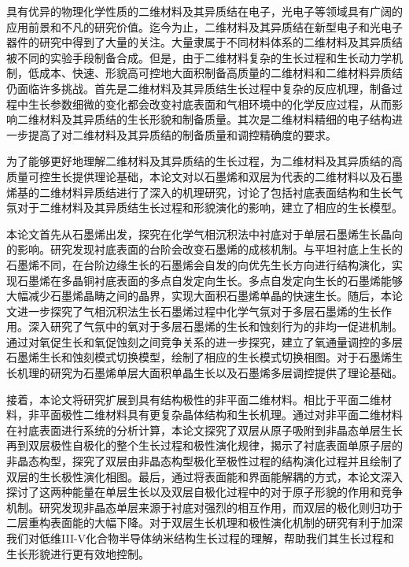 \begin{chineseabstract}
    具有优异的物理化学性质的二维材料及其异质结在电子，光电子等领域具有广阔的应用前景和不凡的研究价值。迄今为止，二维材料及其异质结在新型电子和光电子器件的研究中得到了大量的关注。大量隶属于不同材料体系的二维材料及其异质结被不同的实验手段制备合成。但是，由于二维材料复杂的生长过程和生长动力学机制，低成本、快速、形貌高可控地大面积制备高质量的二维材料和二维材料异质结仍面临许多挑战。首先是二维材料及其异质结生长过程中复杂的反应机理，制备过程中生长参数细微的变化都会改变衬底表面和气相环境中的化学反应过程，从而影响二维材料及其异质结的生长形貌和制备质量。其次是二维材料精细的电子结构进一步提高了对二维材料及其异质结的制备质量和调控精确度的要求。
    
    为了能够更好地理解二维材料及其异质结的生长过程，为二维材料及其异质结的高质量可控生长提供理论基础，本论文对以石墨烯和双层为代表的二维材料以及石墨烯基的二维材料异质结进行了深入的机理研究，讨论了包括衬底表面结构和生长气氛对于二维材料及其异质结生长过程和形貌演化的影响，建立了相应的生长模型。

    本论文首先从石墨烯出发，探究在化学气相沉积法中衬底对于单层石墨烯生长晶向的影响。研究发现衬底表面的台阶会改变石墨烯的成核机制。与平坦衬底上生长的石墨烯不同，在台阶边缘生长的石墨烯会自发的向优先生长方向进行结构演化，实现石墨烯在多晶铜衬底表面的多点自发定向生长。多点自发定向生长的石墨烯能够大幅减少石墨烯晶畴之间的晶界，实现大面积石墨烯单晶的快速生长。随后，本论文进一步探究了气相沉积法生长石墨烯过程中化学气氛对于多层石墨烯的生长作用。深入研究了气氛中的氧对于多层石墨烯的生长和蚀刻行为的非均一促进机制。通过对氧促生长和氧促蚀刻之间竞争关系的进一步探究，建立了氧通量调控的多层石墨烯生长和蚀刻模式切换模型，绘制了相应的生长模式切换相图。对于石墨烯生长机理的研究为石墨烯单层大面积单晶生长以及石墨烯多层调控提供了理论基础。

    接着，本论文将研究扩展到具有结构极性的非平面二维材料。相比于平面二维材料，非平面极性二维材料具有更复杂晶体结构和生长机理。通过对非平面二维材料在衬底表面进行系统的分析计算，本论文探究了双层从原子吸附到非晶态单层生长再到双层极性自极化的整个生长过程和极性演化规律，揭示了衬底表面单原子层的非晶态构型，探究了双层由非晶态构型极化至极性过程的结构演化过程并且绘制了双层的生长极性演化相图。最后，通过将表面能和界面能解耦的方式，本论文深入探讨了这两种能量在单层生长以及双层自极化过程中的对于原子形貌的作用和竞争机制。研究发现非晶态单层来源于衬底对强烈的相互作用，而双层的极化则归功于二层重构表面能的大幅下降。对于双层生长机理和极性演化机制的研究有利于加深我们对低维III-V化合物半导体纳米结构生长过程的理解，帮助我们其生长过程和生长形貌进行更有效地控制。


\end{chineseabstract}
